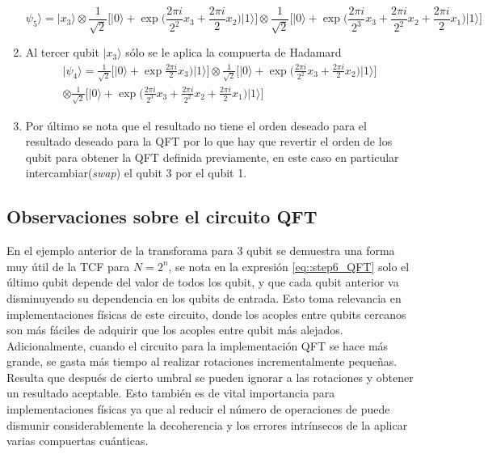 \documentclass[a4paper]{article}
\begin{document}
\begin{enumerate}
\begin{equation}
\psi_5\rangle=\vert x_3\rangle \otimes \frac{1}{\sqrt{2}}\bigg[ \vert 0\rangle + \exp{\bigg(\frac{2\pi i}{2^2} x_3 + \frac{2\pi i}{2} x_2 \bigg)}\vert 1\rangle\bigg] \otimes  \frac{1}{\sqrt{2}}\bigg[ \vert 0\rangle + \exp{\bigg(\frac{2\pi i}{2^3} x_3 +\frac{2\pi i}{2^2} x_2+\frac{2\pi i}{2} x_1\bigg)}\vert 1\rangle\bigg]
\end{equation}
\item Al tercer qubit $\vert x_3\rangle$ sólo se le aplica la compuerta de Hadamard
\begin{equation}\label{eq::step6_QFT}
\begin{aligned}
\vert \psi_4 \rangle= \frac{1}{\sqrt{2}}\bigg[ \vert 0\rangle + \exp{ \frac{2\pi i}{2} x_3 \bigg)}\vert 1\rangle\bigg] \otimes \frac{1}{\sqrt{2}}\bigg[ \vert 0\rangle + \exp{\bigg(\frac{2\pi i}{2^2} x_3 + \frac{2\pi i}{2} x_2 \bigg)}\vert 1\rangle\bigg]\\
 \otimes  \frac{1}{\sqrt{2}}\bigg[ \vert 0\rangle + \exp{\bigg(\frac{2\pi i}{2^3} x_3 +\frac{2\pi i}{2^2} x_2+\frac{2\pi i}{2} x_1\bigg)}\vert 1\rangle\bigg]
\end{aligned}
\end{equation}
\item Por último se nota que el resultado no tiene el orden deseado para el resultado deseado para la QFT por lo que hay que revertir el orden de los qubit para obtener la QFT definida previamente, en este caso en particular intercambiar(\textit{swap}) el qubit 3 por el qubit 1.
\end{enumerate}
\subsection{Observaciones sobre el circuito QFT}
En el ejemplo anterior de la transforama para 3 qubit se demuestra una forma muy útil de la TCF para $N=2^n$, se nota en la expresión \ref{eq::step6_QFT} solo el último qubit depende del valor de todos los qubit, y que cada qubit anterior va disminuyendo su dependencia en los qubits de entrada. Esto toma relevancia en implementaciones físicas de este circuito, donde los acoples entre qubits cercanos son más fáciles de adquirir que los acoples entre qubit más alejados.\\

Adicionalmente, cuando el circuito para la implementación QFT se hace más grande, se gasta más tiempo al realizar rotaciones incrementalmente pequeñas. Resulta que después de cierto umbral se pueden ignorar a las rotaciones y obtener un resultado aceptable. Esto también es de vital importancia para implementaciones físicas ya que al reducir el número de operaciones de puede dismunir considerablemente la decoherencia y los errores intrínsecos de la aplicar varias compuertas cuánticas.
\end{document}
